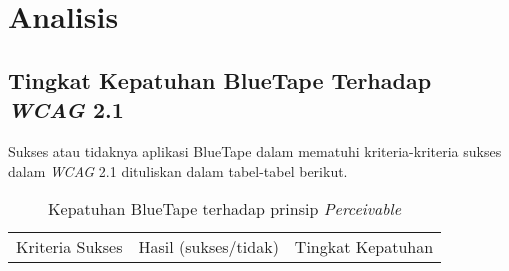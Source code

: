 \chapter{Analisis}
\label{chap:analisis}

\section{Tingkat Kepatuhan BlueTape Terhadap \textit{WCAG} 2.1}
\label{sec:kepatuhan_bluetape_terhadap_wcag_2.1}
Sukses atau tidaknya aplikasi BlueTape dalam mematuhi kriteria-kriteria sukses dalam \textit{WCAG} 2.1 dituliskan dalam tabel-tabel berikut.
\begin{table}[H]
    \centering 
    \caption{Kepatuhan BlueTape terhadap prinsip \textit{Perceivable}}
    \label{tab:kepatuhan_bluetape_perceivable}
    \begin{tabular}{|c|c|c|}
        \toprule
        Kriteria Sukses & Hasil (sukses/tidak) & Tingkat Kepatuhan \\


\end{tabular}
\end{table}
